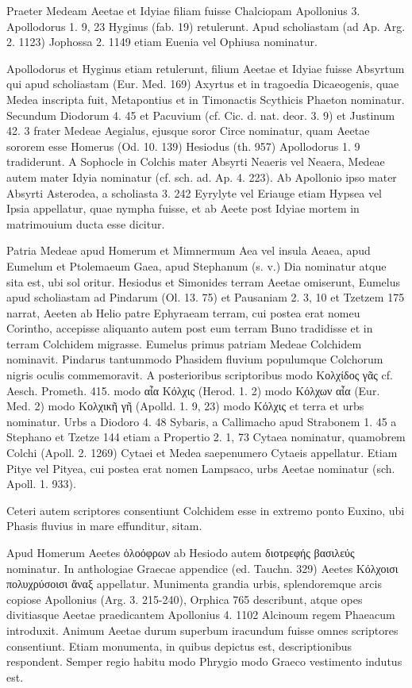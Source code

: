 \documentclass[a4paper, 11pt, oneside, polutonikogreek, german]{article}
\begin{document}
Praeter Medeam Aeetae et Idyiae filiam fuisse Chalciopam Apollonius 3. Apollodorus 1. 9, 23 Hyginus (fab. 19) retulerunt. Apud scholiastam (ad Ap. Arg. 2. 1123) Jophossa 2. 1149 etiam Euenia vel Ophiusa nominatur.

Apollodorus et Hyginus etiam retulerunt, filium Aeetae et Idyiae fuisse Absyrtum qui apud scholiastam (Eur. Med. 169) Axyrtus et in tragoedia Dicaeogenis, quae Medea inscripta fuit, Metapontius et in Timonactis Scythicis Phaeton nominatur. Secundum Diodorum 4. 45 et Pacuvium (cf. Cic. d. nat. deor. 3. 9) et Justinum 42. 3 frater Medeae Aegialus, ejusque soror Circe nominatur, quam Aeetae sororem esse Homerus (Od. 10. 139) Hesiodus (th. 957) Apollodorus 1. 9 tradiderunt. A Sophocle in Colchis mater Absyrti Neaeris vel Neaera, Medeae autem mater Idyia nominatur (cf. sch. ad. Ap. 4. 223). Ab Apollonio ipso mater Absyrti Asterodea, a scholiasta 3. 242 Eyrylyte vel Eriauge etiam Hypsea vel Ipsia appellatur, quae nympha fuisse, et ab Aeete post Idyiae mortem in matrimouium ducta esse dicitur.

Patria Medeae apud Homerum et Mimnermum Aea vel insula Aeaea, apud Eumelum et Ptolemaeum Gaea, apud Stephanum (s. v.) Dia nominatur atque sita est, ubi sol oritur. Hesiodus et Simonides terram Aeetae omiserunt, Eumelus apud scholiastam ad Pindarum (Ol. 13. 75) et Pausaniam 2. 3, 10 et Tzetzem 175 narrat, Aeeten ab Helio patre Ephyraeam terram, cui postea erat nomeu Corintho, accepisse aliquanto autem post eum terram Buno tradidisse et in terram Colchidem migrasse. Eumelus primus patriam Medeae Colchidem nominavit. Pindarus tantummodo Phasidem fluvium populumque Colchorum nigris oculis commemoravit. A posterioribus scriptoribus modo Κολχίδος γᾶς cf. Aesch. Prometh. 415. modo αἶα Κόλχις (Herod. 1. 2) modo Κόλχων αἶα (Eur. Med. 2) modo Κολχικῆ γῆ (Apolld. 1. 9, 23) modo Κόλχις et terra et urbs nominatur. Urbs a Diodoro 4. 48 Sybaris, a Callimacho apud Strabonem 1. 45 a Stephano et Tzetze 144 etiam a Propertio 2. 1, 73 Cytaea nominatur, quamobrem Colchi (Apoll. 2. 1269) Cytaei et Medea saepenumero Cytaeis appellatur. Etiam Pitye vel Pityea, cui postea erat nomen Lampsaco, urbs Aeetae nominatur (sch. Apoll. 1. 933).

Ceteri autem scriptores consentiunt Colchidem esse in extremo ponto Euxino, ubi Phasis fluvius in mare effunditur, sitam.

Apud Homerum Aeetes ὀλοόφρων ab Hesiodo autem διοτρεφής βασιλεύς nominatur. In anthologiae Graecae appendice (ed. Tauchn. 329) Aeetes Κόλχοισι πολυχρύσοισι ἄναξ appellatur. Munimenta grandia urbis, splendoremque arcis copiose Apollonius (Arg. 3. 215-240), Orphica 765 describunt, atque opes divitiasque Aeetae praedicantem Apollonius 4. 1102 Alcinoum regem Phaeacum introduxit. Animum Aeetae durum superbum iracundum fuisse omnes scriptores consentiunt. Etiam monumenta, in quibus depictus est, descriptionibus respondent. Semper regio habitu modo Phrygio modo Graeco vestimento indutus est.
\clearpage
\end{document}
